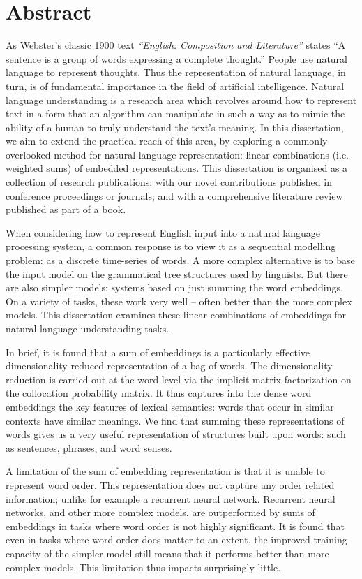 \documentclass{book}
\begin{document}
\chapter*{Abstract}
As Webster's classic 1900 text \textit{``English: Composition and Literature''} states
``A sentence is a group of words expressing a complete thought.''
People use natural language to represent thoughts.
Thus the representation of natural language, in turn, is of fundamental importance in the field of artificial intelligence.
Natural language understanding is a research area which  revolves around how to represent text in a form that an algorithm can manipulate in such a way as to mimic the ability of a human to truly understand the text's meaning.
In this dissertation, we aim to extend the practical reach of this area,
by exploring a commonly overlooked method for natural language representation: linear combinations (i.e. weighted sums) of embedded representations.
This dissertation is organised as a collection of research publications:
 with our novel contributions published in conference proceedings or journals;
 and with a comprehensive literature review published as part of a book.

When considering how to represent English input into a natural language processing system,
a common response is to view it as a sequential modelling problem: as a discrete time-series of words.
A more complex alternative is to base the input model on the grammatical tree structures used by linguists.
But there are also simpler models: systems based on just summing the word embeddings.
On a variety of tasks, these work very well -- often better than the more complex models.
This dissertation examines these linear combinations of embeddings for natural language understanding tasks.

In brief, it is found that a sum of embeddings is a particularly effective dimensionality-reduced representation of a bag of words.
The dimensionality reduction is carried out at the word level via the implicit matrix factorization 
on the collocation probability matrix.
It thus captures into the dense word embeddings the key features of lexical semantics:
words that occur in similar contexts have similar meanings.
We find that summing these representations of words gives us a very useful representation of structures built upon words: such as sentences, phrases, and word senses.

A limitation of the sum of embedding representation is that it is unable to represent word order.
This representation does not capture any order related information; unlike for example a recurrent neural network.
Recurrent neural networks, and other more complex models, are outperformed by sums of embeddings in tasks where word order is not highly significant.
It is found that even in tasks where word order does matter to an extent, the improved training capacity of the simpler model still means that it performs better than more complex models.
This limitation thus impacts surprisingly little.
\end{document}
